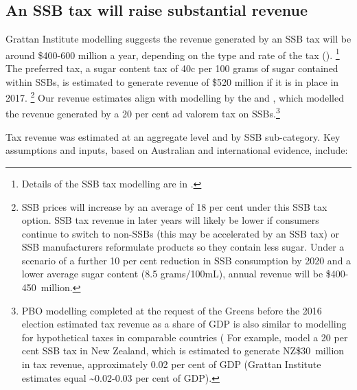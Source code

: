 \documentclass[embargoed]{grattan}
\begin{document}
\subsection{An SSB tax will raise substantial revenue}\label{an-ssb-tax-will-raise-substantial-revenue}


Grattan Institute modelling suggests the revenue generated by an SSB tax will be around \$400-600 million a year, depending on the type and rate of the tax ().%
\footnote{Details of the SSB tax modelling are in .} The preferred tax, a sugar content tax of 40c per 100 grams of sugar contained within SSBs, is estimated to generate revenue of \$520 million if it is in place in 2017.%
\footnote{SSB prices will increase by an average of 18 per cent under this SSB tax option.
SSB tax revenue in later years will likely be lower if consumers continue to switch to non-SSBs (this may be accelerated by an SSB tax) or SSB manufacturers reformulate products so they contain less sugar.
Under a scenario of a further 10 per cent reduction in SSB consumption by 2020 and a lower average sugar content (8.5 grams/100mL), annual revenue will be \$400-450~million.} Our revenue estimates align with modelling by the \textcite{Office2016PolicycostingAustralian} and \textcite{Veerman2016ImpactTaxSugar}, which modelled the revenue generated by a 20 per cent ad valorem tax on SSBs.\footnote{PBO modelling completed at the request of the Greens before the 2016 election estimated tax revenue as a share of GDP is also similar to modelling for hypothetical taxes in comparable countries (\textcites{Andreyeva2011Estimatingpotentialtaxes}{Briggs2013Overallincomespecific} For example, \textcite{Mhurchu2007Nutritionlabelsclaims} model a 20 per cent SSB tax in New Zealand, which is estimated to generate NZ\$30~million in tax revenue, approximately 0.02 per cent of GDP (Grattan Institute estimates equal \textasciitilde{}0.02-0.03 per cent of GDP).}

Tax revenue was estimated at an aggregate level and by SSB sub-category.
Key assumptions and inputs, based on Australian and international evidence, include:
\end{document}
